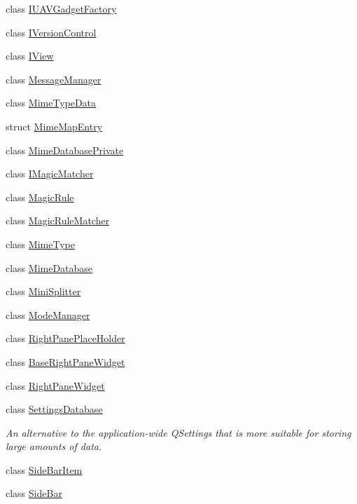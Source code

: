 \begin{DoxyCompactItemize}
\item 
class \hyperlink{class_core_1_1_i_u_a_v_gadget_factory}{I\-U\-A\-V\-Gadget\-Factory}
\item 
class \hyperlink{class_core_1_1_i_version_control}{I\-Version\-Control}
\item 
class \hyperlink{class_core_1_1_i_view}{I\-View}
\item 
class \hyperlink{class_core_1_1_message_manager}{Message\-Manager}
\item 
class \hyperlink{class_core_1_1_mime_type_data}{Mime\-Type\-Data}
\item 
struct \hyperlink{struct_core_1_1_mime_map_entry}{Mime\-Map\-Entry}
\item 
class \hyperlink{class_core_1_1_mime_database_private}{Mime\-Database\-Private}
\item 
class \hyperlink{class_core_1_1_i_magic_matcher}{I\-Magic\-Matcher}
\item 
class \hyperlink{class_core_1_1_magic_rule}{Magic\-Rule}
\item 
class \hyperlink{class_core_1_1_magic_rule_matcher}{Magic\-Rule\-Matcher}
\item 
class \hyperlink{class_core_1_1_mime_type}{Mime\-Type}
\item 
class \hyperlink{class_core_1_1_mime_database}{Mime\-Database}
\item 
class \hyperlink{class_core_1_1_mini_splitter}{Mini\-Splitter}
\item 
class \hyperlink{class_core_1_1_mode_manager}{Mode\-Manager}
\item 
class \hyperlink{class_core_1_1_right_pane_place_holder}{Right\-Pane\-Place\-Holder}
\item 
class \hyperlink{class_core_1_1_base_right_pane_widget}{Base\-Right\-Pane\-Widget}
\item 
class \hyperlink{class_core_1_1_right_pane_widget}{Right\-Pane\-Widget}
\item 
class \hyperlink{class_core_1_1_settings_database}{Settings\-Database}
\begin{DoxyCompactList}\small\item\em An alternative to the application-\/wide Q\-Settings that is more suitable for storing large amounts of data. \end{DoxyCompactList}\item 
class \hyperlink{class_core_1_1_side_bar_item}{Side\-Bar\-Item}
\item 
class \hyperlink{class_core_1_1_side_bar}{Side\-Bar}
\item 

\end{DoxyCompactItemize}
